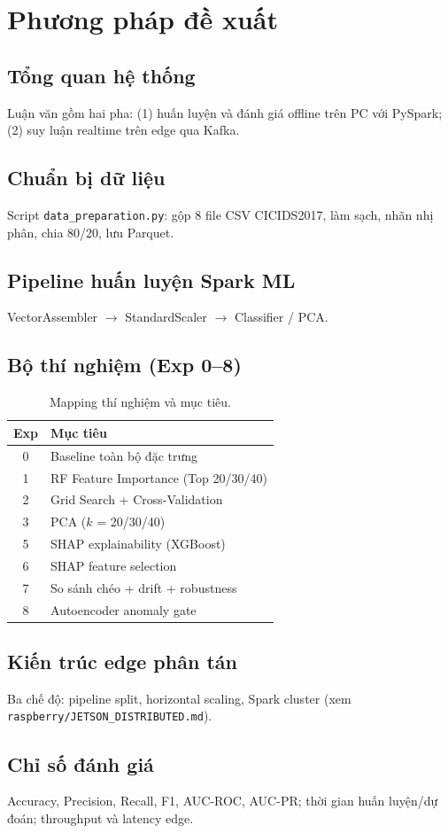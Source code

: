 \chapter{Phương pháp đề xuất}

\section{Tổng quan hệ thống}

Luận văn gồm hai pha: (1) huấn luyện và đánh giá offline trên PC với PySpark; (2) suy luận realtime trên edge qua Kafka.

\section{Chuẩn bị dữ liệu}

Script \texttt{data\_preparation.py}: gộp 8 file CSV CICIDS2017, làm sạch, nhãn nhị phân, chia 80/20, lưu Parquet.

\section{Pipeline huấn luyện Spark ML}

VectorAssembler $\rightarrow$ StandardScaler $\rightarrow$ Classifier / PCA.

\section{Bộ thí nghiệm (Exp 0--8)}

\begin{table}[htbp]
  \centering
  \caption{Mapping thí nghiệm và mục tiêu.}
  \begin{tabular}{cl}
    \toprule
    Exp & Mục tiêu \\
    \midrule
    0 & Baseline toàn bộ đặc trưng \\
    1 & RF Feature Importance (Top 20/30/40) \\
    2 & Grid Search + Cross-Validation \\
    3 & PCA ($k$ = 20/30/40) \\
    5 & SHAP explainability (XGBoost) \\
    6 & SHAP feature selection \\
    7 & So sánh chéo + drift + robustness \\
    8 & Autoencoder anomaly gate \\
    \bottomrule
  \end{tabular}
\end{table}

\section{Kiến trúc edge phân tán}

Ba chế độ: pipeline split, horizontal scaling, Spark cluster (xem \texttt{raspberry/JETSON\_DISTRIBUTED.md}).

\section{Chỉ số đánh giá}

Accuracy, Precision, Recall, F1, AUC-ROC, AUC-PR; thời gian huấn luyện/dự đoán; throughput và latency edge.

